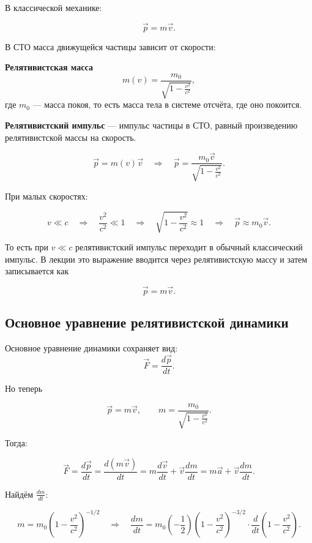\documentclass[a4paper,12pt]{article}
\begin{document}
В классической механике:

\[
\vec p = m \vec v.
\]

В СТО масса движущейся частицы зависит от скорости:

\begin{definitionbox}
\textbf{Релятивистская масса}
\[
m(v)=\frac{m_0}{\sqrt{1-\frac{v^2}{c^2}}},
\]
где $m_0$ — масса покоя, то есть масса тела в системе отсчёта, где оно покоится.
\end{definitionbox}


\begin{definitionbox}
\textbf{Релятивистский импульс} — импульс частицы в СТО, равный произведению релятивистской массы на скорость.

\[
\vec p = m(v)\vec v
\quad \Rightarrow \quad
\vec p =
\frac{m_0 \vec v}{\sqrt{1-\frac{v^2}{c^2}}}.
\]
\end{definitionbox}

При малых скоростях:

\[
v \ll c
\quad \Rightarrow \quad
\frac{v^2}{c^2} \ll 1
\quad \Rightarrow \quad
\sqrt{1-\frac{v^2}{c^2}} \approx 1
\quad \Rightarrow \quad
\vec p \approx m_0 \vec v.
\]

То есть при $v \ll c$ релятивистский импульс переходит в обычный классический импульс. В лекции это выражение вводится через релятивистскую массу и затем записывается как

\[
\vec p = m\vec v.
\]

\subsection*{Основное уравнение релятивистской динамики}

\begin{theorembox}
Основное уравнение динамики сохраняет вид:
\[
\vec F = \frac{d\vec p}{dt}.
\]
\end{theorembox}

Но теперь

\[
\vec p = m\vec v,
\qquad
m = \frac{m_0}{\sqrt{1-\frac{v^2}{c^2}}}.
\]

Тогда:

\[
\vec F
=
\frac{d\vec p}{dt}
=
\frac{d(m\vec v)}{dt}
=
m\frac{d\vec v}{dt}
+
\vec v\frac{dm}{dt}
=
m\vec a
+
\vec v\frac{dm}{dt}.
\]

Найдём $\frac{dm}{dt}$:

\[
m
=
m_0\left(1-\frac{v^2}{c^2}\right)^{-1/2}
\quad \Rightarrow \quad
\frac{dm}{dt}
=
m_0\left(-\frac{1}{2}\right)
\left(1-\frac{v^2}{c^2}\right)^{-3/2}
\cdot
\frac{d}{dt}
\left(1-\frac{v^2}{c^2}\right).
\]
\end{document}
